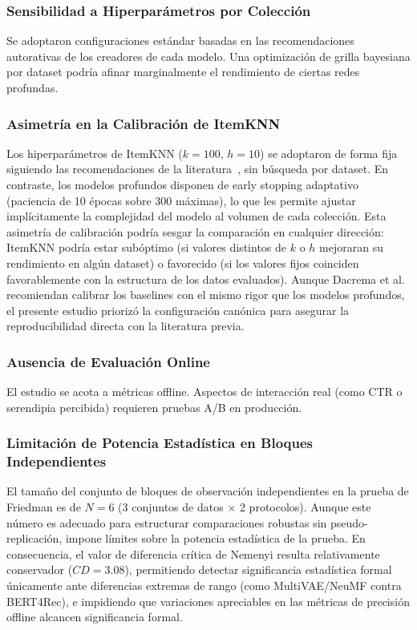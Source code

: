 \documentclass[journal]{IEEEtran}
\begin{document}
\subsubsection{Sensibilidad a Hiperparámetros por Colección}
Se adoptaron configuraciones estándar basadas en las recomendaciones autorativas de los creadores de cada modelo. Una optimización de grilla bayesiana por dataset podría afinar marginalmente el rendimiento de ciertas redes profundas.

\subsubsection{Asimetría en la Calibración de ItemKNN}
\label{subsec:itemknn-tuning}
Los hiperparámetros de ItemKNN ($k=100$, $h=10$) se adoptaron de forma fija siguiendo las recomendaciones de la literatura~\cite{sarwar2001item}, sin búsqueda por dataset. En contraste, los modelos profundos disponen de early stopping adaptativo (paciencia de 10 épocas sobre 300 máximas), lo que les permite ajustar implícitamente la complejidad del modelo al volumen de cada colección. Esta asimetría de calibración podría sesgar la comparación en cualquier dirección: ItemKNN podría estar subóptimo (si valores distintos de $k$ o $h$ mejoraran su rendimiento en algún dataset) o favorecido (si los valores fijos coinciden favorablemente con la estructura de los datos evaluados). Aunque Dacrema et al.~\cite{dacrema2019really} recomiendan calibrar los baselines con el mismo rigor que los modelos profundos, el presente estudio priorizó la configuración canónica para asegurar la reproducibilidad directa con la literatura previa.

\subsubsection{Ausencia de Evaluación Online}
El estudio se acota a métricas offline. Aspectos de interacción real (como CTR o serendipia percibida) requieren pruebas A/B en producción.

\subsubsection{Limitación de Potencia Estadística en Bloques Independientes}
El tamaño del conjunto de bloques de observación independientes en la prueba de Friedman es de $N=6$ (3 conjuntos de datos $\times$ 2 protocolos). Aunque este número es adecuado para estructurar comparaciones robustas sin pseudo-replicación, impone límites sobre la potencia estadística de la prueba. En consecuencia, el valor de diferencia crítica de Nemenyi resulta relativamente conservador ($CD = 3.08$), permitiendo detectar significancia estadística formal únicamente ante diferencias extremas de rango (como MultiVAE/NeuMF contra BERT4Rec), e impidiendo que variaciones apreciables en las métricas de precisión offline alcancen significancia formal.
\end{document}
